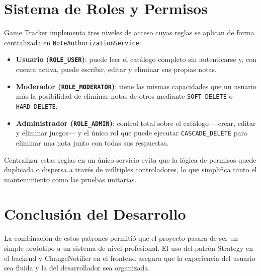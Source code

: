 \section{Sistema de Roles y Permisos}

Game Tracker implementa tres niveles de acceso cuyas reglas se aplican de
forma centralizada en \texttt{NoteAuthorizationService}:

\begin{itemize}
    \item \textbf{Usuario (\texttt{ROLE\_USER})}: puede leer el catálogo
    completo sin autenticarse y, con cuenta activa, puede escribir, editar y
    eliminar sus propias notas.
    \item \textbf{Moderador (\texttt{ROLE\_MODERATOR})}: tiene las mismas
    capacidades que un usuario más la posibilidad de eliminar notas de otros
    mediante \texttt{SOFT\_DELETE} o \texttt{HARD\_DELETE}.
    \item \textbf{Administrador (\texttt{ROLE\_ADMIN})}: control total sobre
    el catálogo —crear, editar y eliminar juegos— y el único rol que puede
    ejecutar \texttt{CASCADE\_DELETE} para eliminar una nota junto con todas
    sus respuestas.
\end{itemize}

Centralizar estas reglas en un único servicio evita que la lógica de permisos
quede duplicada o dispersa a través de múltiples controladores, lo que
simplifica tanto el mantenimiento como las pruebas unitarias.

\section{Conclusión del Desarrollo}

La combinación de estos patrones permitió que el proyecto pasara de ser un
simple prototipo a un sistema de nivel profesional. El uso del patrón Strategy
en el backend y ChangeNotifier en el frontend asegura que la experiencia del
usuario sea fluida y la del desarrollador sea organizada.